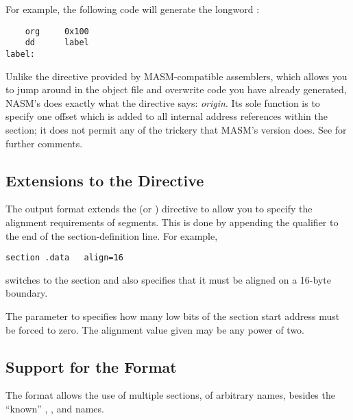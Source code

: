 For example, the following code will generate the longword
:

\begin{lstlisting}
    org     0x100
    dd      label
label:
\end{lstlisting}

Unlike the  directive provided by MASM-compatible assemblers,
which allows you to jump around in the object file and overwrite
code you have already generated, NASM's  does exactly what
the directive says: \emph{origin}. Its sole function is to specify one
offset which is added to all internal address references within the
section; it does not permit any of the trickery that MASM's version
does. See  for further comments.

\subsection{ Extensions to the  Directive}
\label{subsec:binseg}

The  output format extends the  (or )
directive to allow you to specify the alignment requirements of segments.
This is done by appending the  qualifier to the end of
the section-definition line. For example,

\begin{lstlisting}
section .data   align=16
\end{lstlisting}

switches to the section  and also specifies that it must be
aligned on a 16-byte boundary.

The parameter to  specifies how many low bits of the
section start address must be forced to zero. The alignment value
given may be any power of two.

\subsection{ Support for the  Format}
\label{subsec:multisec}

The  format allows the use of multiple sections, of arbitrary names,
besides the ``known'' , , and  names.


